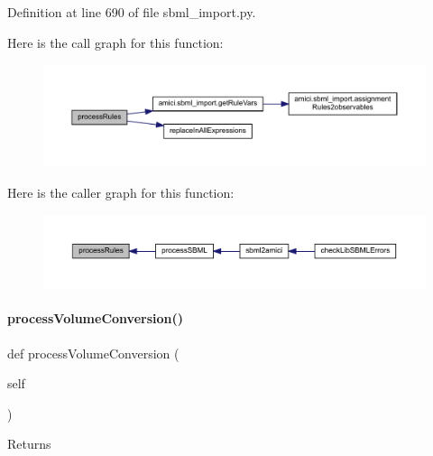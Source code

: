 Definition at line 690 of file sbml\+\_\+import.\+py.

Here is the call graph for this function\+:
\nopagebreak
\begin{figure}[H]
\begin{center}
\leavevmode
\includegraphics[width=350pt]{classamici_1_1sbml__import_1_1_sbml_importer_a7df6b4ae4e3e757bc8de5e0cc54fe16b_cgraph}
\end{center}
\end{figure}
Here is the caller graph for this function\+:
\nopagebreak
\begin{figure}[H]
\begin{center}
\leavevmode
\includegraphics[width=350pt]{classamici_1_1sbml__import_1_1_sbml_importer_a7df6b4ae4e3e757bc8de5e0cc54fe16b_icgraph}
\end{center}
\end{figure}
\mbox{\label{classamici_1_1sbml__import_1_1_sbml_importer_af2a2cbf8550d30fc0e95a875758b8262}} 
\paragraph{\texorpdfstring{process\+Volume\+Conversion()}{processVolumeConversion()}}
{\footnotesize\ttfamily def process\+Volume\+Conversion (\begin{DoxyParamCaption}\item[{}]{self }\end{DoxyParamCaption})}

\begin{DoxyReturn}{Returns}

\end{DoxyReturn}



